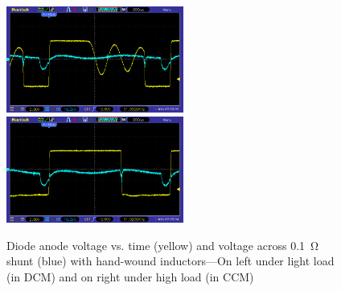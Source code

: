 \documentclass[a4paper]{article}
\begin{document}
\begin{figure}
  \centering
  \includegraphics[height=3.5cm]{pic_25_1}\hfill\includegraphics[height=3.5cm]{pic_25_4}
  \caption[Voltage and current traces with handwound inductors]{Diode
    anode voltage vs. time (yellow) and voltage across \qty{0.1}{\ohm}
    shunt (blue) with hand-wound inductors---On left under light load (in
    DCM) and on right under high load (in CCM)}
\end{figure}
\end{document}
